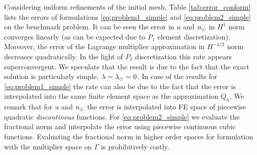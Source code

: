 Considering uniform refinements of the initial mesh, Table \ref{tab:error_conform}
lists the errors of formulations \eqref{eq:problem1_simple} and \eqref{eq:problem2_simple}
on the benchmark problem. It can be seen the error in $u$ and $u_{\odot}$ in $H^1$ norm
converges linearly (as can be expected due to $P_1$ element discretization).
Moreover, the error of the Lagrange multiplier approximation in $H^{-1/2}$ norm
decreases quadratically. In the light of $P_1$ discretization this rate appears
superconvergent. We speculate that the result is due to the fact that the
exact solution is particularly simple, $\lambda=\lambda_{\odot}=0$. In case of the results for
\eqref{eq:problem1_simple} the rate can also be due to the fact that the
error is interpolated into the same finite element space as the approximation $Q_h$.
We remark that for $u$ and $u_{\odot}$ the error is interpolated into FE space of piecewise
quadratic \emph{discontinous} functions. For \eqref{eq:problem2_simple} we
evaluate the fractional norm and interpolate the error using piecewise continuous
cubic functions. Evaluating the fractional norm in higher order spaces
for formulation with the multiplier space on $\Gamma$ is prohibitively costly. 

